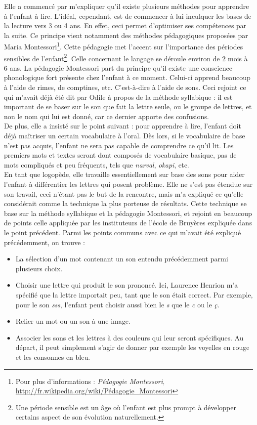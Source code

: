 Elle a commencé par m'expliquer qu'il existe plusieurs méthodes pour apprendre à l'enfant à lire. L'idéal, cependant, est de commencer à lui inculquer les bases de la lecture vers 3 ou 4 ans. En effet, ceci permet d'optimiser ses compétences par la suite. Ce principe vient notamment des méthodes pédagogiques proposées par Maria Montessori\footnote{Pour plus d'informations : \textit{Pédagogie Montessori}, \url{http://fr.wikipedia.org/wiki/Pédagogie_Montessori}}. Cette pédagogie met l'accent sur l'importance des périodes sensibles de l'enfant\footnote{Une période sensible est un âge où l'enfant est plus prompt à développer certains aspect de son évolution naturellement.}. Celle concernant le langage se déroule environ de 2 mois à 6 ans. La pédagogie Montessori part du principe qu'il existe une conscience phonologique fort présente chez l'enfant à ce moment. Celui-ci apprend beaucoup à l'aide de rimes, de comptines, etc. C'est-à-dire à l'aide de sons. Ceci rejoint ce qui m'avait déjà été dit par Odile à propos de la méthode syllabique : il est important de se baser sur le son que fait la lettre seule, ou le groupe de lettres, et non le nom qui lui est donné, car ce dernier apporte des confusions.\\

De plus, elle a insisté sur le point suivant : pour apprendre à lire, l'enfant doit déjà maîtriser un certain vocabulaire à l'oral. Dès lors, si le vocabulaire de base n'est pas acquis, l'enfant ne sera pas capable de comprendre ce qu'il lit. Les premiers mots et textes seront dont composés de vocabulaire basique, pas de mots compliqués et peu fréquents, tels que \textit{narval}, \textit{okapi}, etc. \\

En tant que logopède, elle travaille essentiellement sur base des sons pour aider l'enfant à différentier les lettres qui posent problème. Elle ne s'est pas étendue sur son travail, ceci n'étant pas le but de la rencontre, mais m'a  expliqué ce qu'elle considérait comme la technique la plus porteuse de résultats. Cette technique se base sur la méthode syllabique et la pédagogie Montessori, et rejoint en beaucoup de points celle appliquée par les instituteurs de l'école de Bruyères expliquée dans le point précédent. Parmi les points communs avec ce qui m'avait été expliqué précédemment, on trouve :
\begin{itemize}
\item La sélection d'un mot contenant un son entendu précédemment parmi plusieurs choix.
\item Choisir une lettre qui produit le son prononcé. Ici, Laurence Henrion m'a spécifié que la lettre importait peu, tant que le son était correct. Par exemple, pour le son \textit{sss}, l'enfant peut choisir aussi bien le \textit{s} que le \textit{c} ou le \textit{ç.}
\item Relier un mot ou un son à une image.
\item Associer les sons et les lettres à des couleurs qui leur seront spécifiques. Au départ, il peut simplement s'agir de donner par exemple les voyelles en rouge et les consonnes en bleu.\\
\end{itemize}

